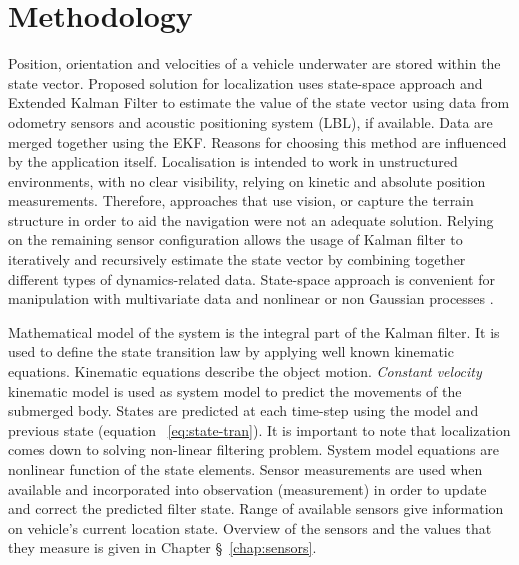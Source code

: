 \chapter{Methodology} \label{chap:methodology}
Position, orientation and velocities of a vehicle underwater are stored within the state vector. Proposed solution for localization uses state-space approach and Extended Kalman Filter to estimate the value of the state vector using data from odometry sensors and acoustic positioning system (LBL), if available. Data are merged together using the EKF. Reasons for choosing this method are influenced by the application itself. Localisation is intended to work in unstructured environments, with no clear visibility, relying on kinetic and absolute position measurements. Therefore, approaches that use vision, or capture the terrain structure in order to aid the navigation were not an adequate solution. Relying on the remaining sensor configuration allows the usage of Kalman filter to iteratively and recursively estimate the state vector by combining together different types of dynamics-related data. State-space approach is convenient for manipulation with multivariate data and nonlinear or non Gaussian processes \cite{ristic04}. 

Mathematical model of the system is the integral part of the Kalman filter. It is used to define the state transition law by applying well known kinematic equations.  Kinematic equations describe the object motion. \textit{Constant velocity} kinematic model is used as system model to predict the movements of the submerged body. States are predicted at each time-step using the model and previous state (equation ~\ref{eq:state-tran}). It is important to note that localization comes down to solving non-linear filtering problem. System model equations are nonlinear function of the state elements. Sensor measurements are used when available and incorporated into observation (measurement) in order to update and correct the predicted filter state. Range of available sensors give information on vehicle's current location state. Overview of the sensors and the values that they measure is given in Chapter \S~\ref{chap:sensors}.
